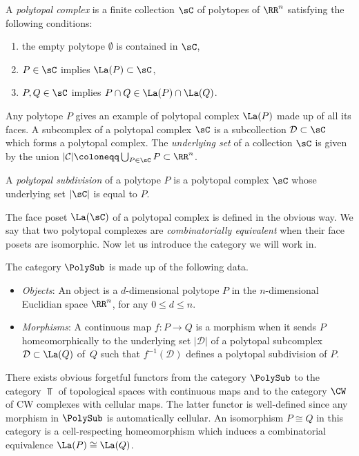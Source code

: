 \begin{definition}
A \emph{polytopal complex} is a finite collection $\sC$ of polytopes of $\RR^n$ satisfying the following conditions:
\begin{enumerate}
\item the empty polytope $\emptyset$ is contained in $\sC$,
\item $P \in \sC$ implies $\La(P) \subset \sC$,
\item $P, Q\in \sC$ implies $P\cap Q\in \La(P)\cap \La(Q)$.
\end{enumerate}
\end{definition}
Any polytope $P$ gives an example of polytopal complex $\La(P)$ made up of all its faces.
A subcomplex of a polytopal complex $\sC$ is a subcollection
$\mathcal{D}\subset \sC$ which forms a polytopal complex.
The \emph{underlying set} of a collection $\sC$ is given by the union $|\mathcal{C}|\coloneqq\bigcup_{P\in \sC} P\subset \RR^n$.

\begin{definition}
A \emph{polytopal subdivision} of a polytope $P$ is a polytopal complex $\sC$
whose underlying set $|\sC|$ is equal to $P$.
\end{definition}

The face poset $\La(\sC)$ of a polytopal complex is defined in the obvious way.
We say that two polytopal complexes are \emph{combinatorially equivalent} when their face posets are isomorphic.
Now let us introduce the category we will work in.

\begin{definition}
The category $\PolySub$ is made up of the following data.
\begin{itemize}
\item\emph{Objects}: An object is a $d$-dimensional polytope $P$ in the $n$-dimensional Euclidian space $\RR^n$, for any $0\leq d\leq n$.
\item\emph{Morphisms}: A continuous map $f: P\to Q$ is a morphism when
it sends $P$ homeomorphically to the underlying set $|\mathcal{D}|$ of a polytopal subcomplex $\mathcal{D}\subset \La(Q)$ of~$Q$
such that $f^{-1}(\mathcal D)$ defines a polytopal subdivision of $P$.
\end{itemize}
\end{definition}

There exists obvious forgetful functors from the category $\PolySub$ to the category $\Top$ of topological spaces with continuous maps and to the category $\CW$ of CW complexes with cellular maps. The latter functor is well-defined since any morphism in $\PolySub$ is automatically cellular.
An isomorphism $P\cong Q$ in this category is a cell-respecting homeomorphism which induces
a combinatorial equivalence $\La (P)\cong \La(Q)$.

